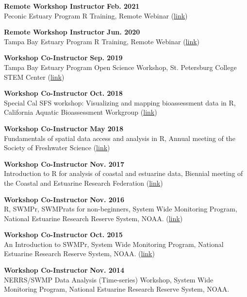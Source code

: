 \documentclass[letterpaper,12pt]{article}
\begin{document}
{\bf Remote Workshop Instructor} \hfill {\bf Feb. 2021}\\
Peconic Estuary Program R Training, Remote Webinar ({\footnotesize\href{https://tbep-tech.github.io/pep-r-training/}{link}})

{\bf Remote Workshop Instructor} \hfill {\bf Jun. 2020}\\
Tampa Bay Estuary Program R Training, Remote Webinar ({\footnotesize\href{https://tbep-tech.github.io/tbep-r-training/}{link}})

{\bf Workshop Co-Instructor} \hfill {\bf Sep. 2019}\\
Tampa Bay Estuary Program Open Science Workshop, St. Petersburg College STEM Center ({\footnotesize\href{https://tbep-tech.github.io/}{link}})

{\bf Workshop Co-Instructor} \hfill {\bf Oct. 2018}\\
Special Cal SFS workshop: Visualizing and mapping bioassessment data in R, California Aquatic Bioassessment Workgroup ({\footnotesize\href{https://sccwrp.github.io/CABW2018_R_training}{link}})

{\bf Workshop Co-Instructor} \hfill {\bf May 2018}\\
Fundamentals of spatial data access and analysis in R, Annual meeting of the Society of Freshwater Science ({\footnotesize\href{https://ryan-hill.github.io/sfs-r-gis-2018/}{link}})

{\bf Workshop Co-Instructor} \hfill {\bf Nov. 2017}\\
Introduction to R for analysis of coastal and estuarine data, Biennial meeting of the Coastal and Estuarine Research Federation ({\footnotesize\href{https://usepa.github.io/cerf_r/}{link}})

{\bf Workshop Co-Instructor} \hfill {\bf Nov. 2016}\\
R, SWMPr, SWMPrats for non-beginners, System Wide Monitoring Program, National Estuarine Research Reserve System, NOAA. ({\footnotesize\href{http://swmprats.net/2016-workshop}{link}})

{\bf Workshop Co-Instructor} \hfill {\bf Oct. 2015}\\
An Introduction to SWMPr, System Wide Monitoring Program, National Estuarine Research Reserve System, NOAA. ({\footnotesize\href{http://swmprats.net/workshop-2015}{link}})

{\bf Workshop Co-Instructor} \hfill {\bf Nov. 2014}\\
NERRS/SWMP Data Analysis (Time-series) Workshop, System Wide Monitoring Program, National Estuarine Research Reserve System, NOAA.
\end{document}
